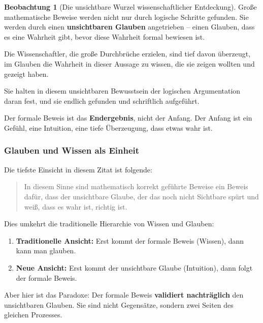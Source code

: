 \documentclass[a4paper,12pt,twoside]{report}
\theoremstyle{definition}
\newtheorem{beobachtung}{Beobachtung}
\begin{document}
\begin{beobachtung}[Die unsichtbare Wurzel wissenschaftlicher Entdeckung]
	Große mathematische Beweise werden nicht nur durch logische Schritte gefunden. Sie werden durch einen \textbf{unsichtbaren Glauben} angetrieben -- einen Glauben, dass es eine Wahrheit gibt, bevor diese Wahrheit formal bewiesen ist.
	
	Die Wissenschaftler, die große Durchbrüche erzielen, sind tief davon überzeugt, im Glauben die Wahrheit in dieser Aussage zu wissen, die sie zeigen wollten und gezeigt haben.
	
	Sie halten in diesem unsichtbaren Bewusstsein der logischen Argumentation daran fest, und sie endlich gefunden und schriftlich aufgeführt.
	
	Der formale Beweis ist das \textbf{Endergebnis}, nicht der Anfang. Der Anfang ist ein Gefühl, eine Intuition, eine tiefe Überzeugung, dass etwas wahr ist.
\end{beobachtung}

\subsubsection*{Glauben und Wissen als Einheit}

Die tiefste Einsicht in diesem Zitat ist folgende:

\begin{quote}
In diesem Sinne sind mathematisch korrekt geführte Beweise ein Beweis dafür, dass der unsichtbare Glaube, der das noch nicht Sichtbare spürt und weiß, dass es wahr ist, richtig ist.
\end{quote}

Dies umkehrt die traditionelle Hierarchie von Wissen und Glauben:

\begin{enumerate}
	\item \textbf{Traditionelle Ansicht:} Erst kommt der formale Beweis (Wissen), dann kann man glauben.
	
	\item \textbf{Neue Ansicht:} Erst kommt der unsichtbare Glaube (Intuition), dann folgt der formale Beweis.
\end{enumerate}

Aber hier ist das Paradoxe: Der formale Beweis \textbf{validiert nachträglich} den unsichtbaren Glauben. Sie sind nicht Gegensätze, sondern zwei Seiten des gleichen Prozesses.
\end{document}
